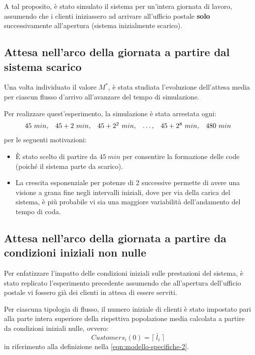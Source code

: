 A tal proposito, è stato simulato il sistema per un'intera giornata di lavoro, assumendo che i clienti iniziassero ad arrivare all'ufficio postale \textbf{solo} successivamente all'apertura (sistema inizialmente scarico).

\subsection*{Attesa nell'arco della giornata a partire dal sistema scarico}
Una volta individuato il valore $M^*$, è stata studiata l'evoluzione dell'attesa media per ciascun flusso d'arrivo all'avanzare del tempo di simulazione.

Per realizzare quest'esperimento, la simulazione è stata arrestata ogni:
\begin{equation}
\begin{array}{l l l l l l}
45\ min, & 45 + 2\ min, & 45 + 2^2\ min, & \dots, & 45 + 2^8\ min, & 480\ min
\end{array}
\end{equation}
per le seguenti motivazioni:
\begin{itemize}
\item È stato scelto di partire da $45\ min$ per consentire la formazione delle code (poiché il sistema parte da scarico).
\item La crescita esponenziale per potenze di 2 successive permette di avere una visione a grana fine negli intervalli iniziali, dove per via della carica del sistema, è più probabile vi sia una maggiore variabilità dell'andamento del tempo di coda. 
\end{itemize}

\subsection*{Attesa nell'arco della giornata a partire da condizioni iniziali non nulle}
Per enfatizzare l'impatto delle condizioni iniziali sulle prestazioni del sistema, è stato replicato l'esperimento precedente assumendo che all'apertura dell'ufficio postale vi fossero già dei clienti in attesa di essere serviti.

Per ciascuna tipologia di flusso, il numero iniziale di clienti è stato impostato pari alla parte intera superiore della rispettiva popolazione media calcolata a partire da condizioni iniziali nulle, ovvero:
\begin{equation}
Customers_i(0) = \lceil\ \bar{l}_i\ \rceil
\end{equation}
in riferimento alla definizione nella \ref{eqn:modello-specifiche-2}.
	
